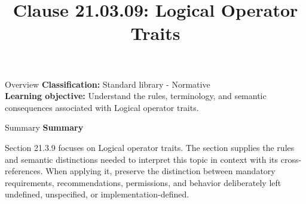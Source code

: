 \documentclass[10pt,letterpaper]{article}
\title{Clause 21.03.09: Logical Operator Traits}
\author{}
\date{}
\begin{document}
\maketitle
\begin{CornellOverviewBox}{Overview}
\textbf{Classification:} Standard library - Normative\\[2pt]
\textbf{Learning objective:} Understand the rules, terminology, and semantic consequences associated with Logical operator traits.
\end{CornellOverviewBox}\begin{CornellSummaryBox}{Summary}
{\sffamily\bfseries\color{Accent} Summary}\par\vspace{3pt}Section 21.3.9 focuses on Logical operator traits. The section supplies the rules and semantic distinctions needed to interpret this topic in context with its cross-references. When applying it, preserve the distinction between mandatory requirements, recommendations, permissions, and behavior deliberately left undefined, unspecified, or implementation-defined.
\end{CornellSummaryBox}
\end{document}
